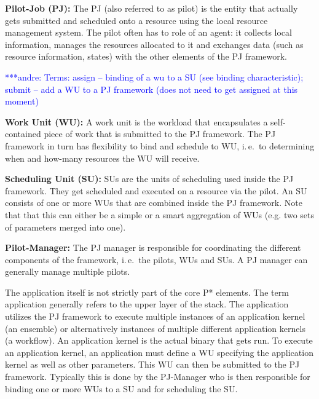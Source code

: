 \documentclass[conference,final]{IEEEtran}
\newcommand{\jhanote}[1]{ {\textcolor{red} { ***shantenu: #1 }}}
\newcommand{\alnote}[1]{ {\textcolor{blue} { ***andre: #1 }}}
\newcommand{\alnote}[1]{}
\newcommand{\jhanote}[1]{}
\begin{document}
\begin{compactitem}
\item \textbf{Pilot-Job (PJ):} The PJ (also referred to as pilot) is the entity
that actually gets submitted and scheduled onto a resource using the local
resource management system. The pilot often has to role of an agent: it collects
local information, manages the resources allocated to it and exchanges data
(such as resource information, states) with the other elements of the PJ
framework. %

\alnote{Terms: assign -- binding of a wu to a SU (see binding
characteristic); submit -- add a WU to a PJ framework (does not need to get
assigned at this moment)}
\item \textbf{Work Unit (WU):} A work unit is the workload that encapsulates a
self-contained piece of work that is submitted to the PJ framework. The PJ
framework in turn has flexibility to bind and schedule to WU, i.\,e.\ to
determining when and how-many resources the WU will receive.

\item \textbf{Scheduling Unit (SU):} SUs are the units of scheduling
  used inside the PJ framework. They get scheduled and executed on a
  resource via the pilot. An SU consists of one or more WUs that are
  combined inside the PJ framework. Note that that this can either be
  a simple or a smart aggregation of WUs (e.g. two sets of parameters
  merged into one).

  


\item \textbf{Pilot-Manager:} The PJ manager is responsible for coordinating
	  the different components of the framework, i.\,e.\ the pilots, WUs and 
	  SUs. A PJ manager can generally manage multiple pilots.
\end{compactitem}
The application itself is not strictly part of the core P* elements. The term
application generally refers to the upper layer of the stack. The application
utilizes the PJ framework to execute multiple instances of an application kernel
(an ensemble) or alternatively instances of multiple different application
kernels (a workflow). An application kernel is the actual binary that gets run.
To execute an application kernel, an application must define a WU specifying the
application kernel as well as other parameters. This WU can then be submitted to
the PJ framework. Typically this is done by the PJ-Manager who is then 
responsible for binding one or more WUs to a SU and for scheduling the SU.
\end{document}
